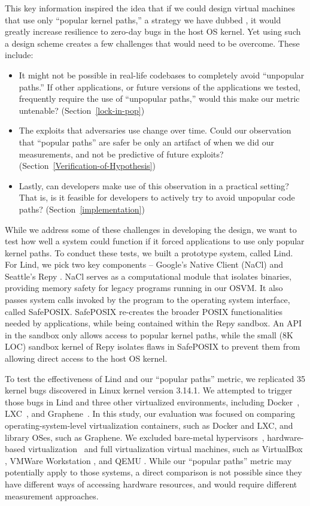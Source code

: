 This key information inspired the idea that if we could design virtual machines
 that use only ``popular kernel paths,'' a strategy we have dubbed \lip,
it would greatly increase resilience to zero-day bugs in the host OS kernel.
Yet using such a design scheme creates a few challenges that would need to be
 overcome. These include:

\begin{itemize}
\item It might not be possible in real-life codebases to completely avoid ``unpopular paths.''
If other applications, or future versions of the applications we tested, frequently require the use of ``unpopular paths,'' would this make our metric untenable?
(Section~{\ref{lock-in-pop}})
\item The exploits that adversaries use change over time. Could our observation that ``popular paths'' are safer be only an artifact of when we did our measurements,
and not be predictive of future exploits? (Section~{\ref{Verification-of-Hypothesis}})
\item Lastly, can developers make use of this observation in a practical setting? That is, is it feasible for developers to actively try to avoid unpopular code paths?
(Section~{\ref{implementation}})
\end{itemize}

While we address some of these challenges in developing the \lip design,
we want to test how well a system could function if it forced applications to
use only popular kernel paths.
To conduct these tests, we built a prototype system, called Lind.
For Lind, we pick two key components -- Google's Native Client
(NaCl) \cite{NaCl-09} and Seattle's Repy \cite{Repy-10}.
NaCl serves as a computational module that isolates
binaries, providing memory safety for legacy programs running in our OSVM.
It also passes system calls invoked by the program to the operating system interface, called SafePOSIX.
SafePOSIX re-creates the broader POSIX functionalities needed by applications, while being contained within the Repy sandbox.
An API in the sandbox only allows access to popular kernel paths, while
the small (8K LOC) sandbox kernel of Repy isolates flaws in SafePOSIX
to prevent them from allowing direct access to the host OS kernel.

To test the effectiveness of Lind and our ``popular paths'' metric,
we replicated 35 kernel bugs discovered in Linux kernel version 3.14.1. We attempted
to trigger those bugs in Lind and three other virtualized environments,
including Docker~\cite{Docker}, LXC~\cite{LXC}, and Graphene~\cite{Graphene-14}.
In this study, our evaluation was focused on comparing operating-system-level virtualization containers, such as Docker and LXC,
and library OSes, such as Graphene.
We excluded bare-metal hypervisors~\cite{Xen-03, VMWare-Server},
hardware-based virtualization~\cite{IntelVT, keller2010nohype} and full virtualization
virtual machines, such as VirtualBox \cite{VirtualBox}, VMWare Workstation \cite{VMWare-Workstation}, and QEMU \cite{QEMU}.
While our ``popular paths'' metric may potentially apply to those
systems, a direct comparison is not possible since they have different
ways of accessing hardware resources, and would require different measurement approaches.

